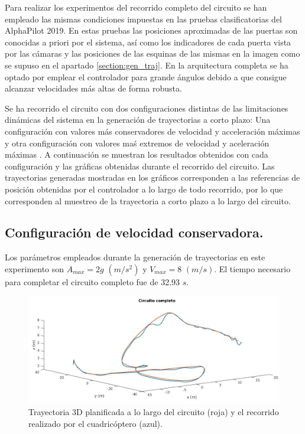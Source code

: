 Para realizar los experimentos del recorrido completo del circuito se han empleado las mismas condiciones impuestas en las pruebas clasificatorias del AlphaPilot 2019. En estas pruebas las posiciones aproximadas de las puertas son conocidas a priori por el sistema, así como los indicadores de cada puerta vista por las cámaras y las posiciones de las esquinas de las mismas en la imagen como se supuso en el apartado \ref{section:gen_traj}.
En la arquitectura completa se ha optado por emplear el controlador para grande ángulos debido a que consigue alcanzar velocidades más altas de forma robusta. 

Se ha recorrido el circuito con dos configuraciones distintas de las limitaciones dinámicas del sistema en la generación de trayectorias a corto plazo: Una configuración con valores más conservadores de velocidad y acceleración máximas y otra configuración con valores maś extremos de velocidad y aceleración máximas . A continuación se muestran los resultados obtenidos con cada configuración y las gráficas obtenidas durante el recorrido del circuito. Las trayectorias generadas mostradas en los gráficos corresponden a las referencias de posición obtenidas por el controlador a lo largo de todo recorrido, por lo que corresponden al muestreo de la trayectoria a corto plazo a lo largo del circuito.

\subsection{Configuración de velocidad conservadora.}

Los parámetros empleados durante la generación de trayectorias en este experimento son $A_{max} = 2g $ $(m/s^2)$ y $V_{max} = 8$ $(m/s)$. El tiempo necesario para completar el circuito completo fue de 32.93 $s$.
\vspace{2cm}
\begin{figure}[htb!]
	\centering
	\includegraphics[width=\textwidth]{imagenes/circuitFigure}
	\caption{Trayectoria 3D planificada a lo largo del circuito (roja) y el recorrido realizado por el cuadricóptero (azul).}
	\label{exp1:1}
\end{figure}

